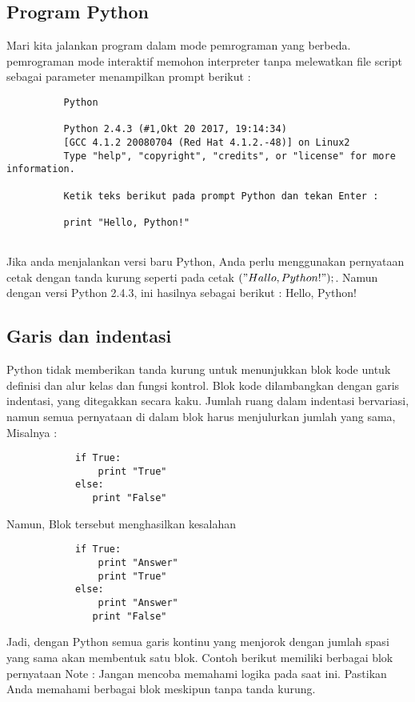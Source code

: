 \subsection{Program Python}
Mari kita jalankan program dalam mode pemrograman yang berbeda. pemrograman mode interaktif memohon interpreter tanpa melewatkan file script sebagai parameter menampilkan prompt berikut :
    \begin{verbatim}
          Python
          
          Python 2.4.3 (#1,Okt 20 2017, 19:14:34)
          [GCC 4.1.2 20080704 (Red Hat 4.1.2.-48)] on Linux2
          Type "help", "copyright", "credits", or "license" for more information.
          
          Ketik teks berikut pada prompt Python dan tekan Enter :
          
          print "Hello, Python!"
          
     \end{verbatim}
Jika anda menjalankan versi baru Python, Anda perlu menggunakan pernyataan cetak dengan tanda kurung seperti pada cetak $("Hallo, Python!");$. Namun dengan versi Python 2.4.3, ini hasilnya sebagai berikut :
Hello, Python!

\subsection{Garis dan indentasi}
Python tidak memberikan tanda kurung untuk menunjukkan blok kode untuk definisi dan alur kelas dan fungsi
kontrol. Blok kode dilambangkan dengan garis indentasi, yang ditegakkan secara kaku.
Jumlah ruang dalam indentasi bervariasi, namun semua pernyataan di dalam blok harus
menjulurkan jumlah yang sama, Misalnya :
    \begin{verbatim}
            if True:
                print "True"
            else:
               print "False"
    \end{verbatim}
    
Namun, Blok tersebut menghasilkan kesalahan
    \begin{verbatim}
            if True:
                print "Answer"
                print "True"
            else:
                print "Answer"
               print "False"
    \end{verbatim}
Jadi, dengan Python semua garis kontinu yang menjorok dengan jumlah spasi yang sama akan membentuk satu blok. Contoh berikut memiliki berbagai blok pernyataan
Note : Jangan mencoba memahami logika pada saat ini. Pastikan Anda memahami berbagai blok meskipun tanpa tanda kurung.


